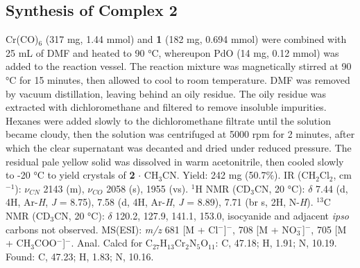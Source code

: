 \subsection{Synthesis of Complex \textbf{2}}
Cr(CO)$_{6}$ (317 mg, 1.44 mmol) and  \textbf{1} (182 mg, 0.694 mmol) were combined with 25 mL of DMF and heated to 90 °C, whereupon PdO (14 mg, 0.12 mmol) was added to the reaction vessel. The reaction mixture was magnetically stirred at 90 °C for 15 minutes, then allowed to cool to room temperature. DMF was removed by vacuum distillation, leaving behind an oily residue. The oily residue was extracted with dichloromethane and filtered to remove insoluble impurities. Hexanes were added slowly to the dichloromethane filtrate until the solution became cloudy, then the solution was centrifuged at 5000 rpm for 2 minutes, after which the clear supernatant was decanted and dried under reduced pressure. The residual pale yellow solid was dissolved in warm acetonitrile, then cooled slowly to -20 °C to yield crystals of \textbf{2} $\cdot$ CH$_{3}$CN. Yield: 242 mg (50.7\%). IR (CH$_{2}$Cl$_{2}$, cm$^{-1}$): $\nu_{CN}$ 2143 (m), $\nu_{CO}$ 2058 (s), 1955 (vs). $^{1}$H NMR (CD$_{3}$CN, 20 °C): $\delta$ 7.44 (d, 4H, Ar-\textit{H}, \textit{J} = 8.75), 7.58 (d, 4H, Ar-\textit{H}, \textit{J} = 8.89), 7.71 (br s, 2H, N-\textit{H}). $^{13}$C NMR (CD$_{3}$CN, 20 °C): $\delta$ 120.2, 127.9, 141.1, 153.0, isocyanide and adjacent \textit{ipso} carbons not observed. MS(ESI): \textit{m/z} 681 [M + Cl$^{-}$]$^{-}$, 708 [M + NO$_{3}^{-}$]$^{-}$, 705 [M + CH$_{3}$COO$^{-}$]$^{-}$. Anal. Calcd for C$_{27}$H$_{13}$Cr$_{2}$N$_{5}$O$_{11}$: C, 47.18; H, 1.91; N, 10.19. Found: C, 47.23; H, 1.83; N, 10.16.

